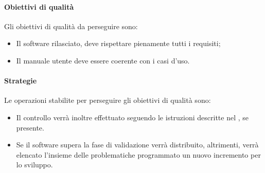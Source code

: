 \documentclass[../NormeDiProgetto_v3.0.0.tex]{subfiles}
\begin{document}
				\paragraph{Obiettivi di qualità}
				Gli obiettivi di qualità da perseguire sono:
				\begin{itemize}
					\item Il software rilasciato, deve rispettare pienamente tutti i requisiti;
					\item Il manuale utente deve essere coerente con i casi d'uso.
				\end{itemize}
				\paragraph{Strategie}
				Le operazioni stabilite per perseguire gli obiettivi di qualità sono:
				\begin{itemize}
					\item Il controllo verrà inoltre effettuato seguendo le istruzioni descritte nel \manualeutente, se presente.
					\item Se il software supera la fase di validazione verrà distribuito, altrimenti, verrà elencato l'insieme delle problematiche programmato un nuovo incremento per lo sviluppo.
				\end{itemize}	
					
\end{document}
